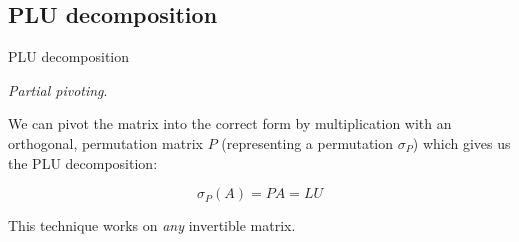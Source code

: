 \documentclass{beamer}
\begin{document}
\subsection{PLU decomposition}

\begin{frame}{PLU decomposition}

    \emph{Partial pivoting}.

    We can pivot the matrix into the correct form by multiplication with
    an orthogonal, permutation matrix $P$ (representing a permutation $\sigma_P$)
    which gives us the PLU decomposition:

    \[
        \sigma_P(A) = PA = LU
    \]

    \begin{block}{}
        This technique works on \emph{any} invertible matrix.
    \end{block}

\end{frame}



\end{document}
